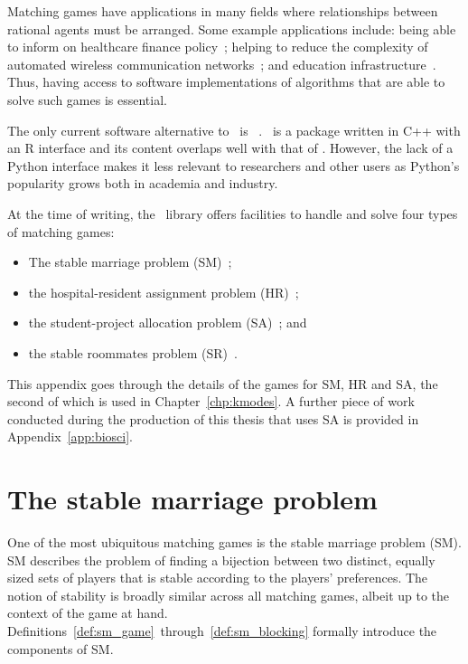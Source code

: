 Matching games have applications in many fields where relationships between
rational agents must be arranged. Some example applications include: being able
to inform on healthcare finance policy~\cite{Agarwal2017}; helping to reduce the
complexity of automated wireless communication networks~\cite{Bayat2016}; and
education infrastructure~\cite{Chiarandini2019}. Thus, having access to software
implementations of algorithms that are able to solve such games is essential.

The only current software alternative to \matching\ is
\matchingr~\cite{Tilly2018}. \matchingr\ is a package written in C++ with an R
interface and its content overlaps well with that of \matching. However, the
lack of a Python interface makes it less relevant to researchers and other users
as Python's popularity grows both in academia and industry.

At the time of writing, the \matching\ library offers facilities to handle and
solve four types of matching games:

\begin{itemize}
    \item The stable marriage problem (SM)~\cite{Gale1962};
    \item the hospital-resident assignment problem
        (HR)~\cite{Gale1962,Roth1984};
    \item the student-project allocation problem
        (SA)~\cite{Abraham2003,Abraham2007}; and
    \item the stable roommates problem (SR)~\cite{Irving1985}.
\end{itemize}

This appendix goes through the details of the games for SM, HR and SA, the
second of which is used in Chapter~\ref{chp:kmodes}. A further piece of work
conducted during the production of this thesis that uses SA is provided in
Appendix~\ref{app:biosci}.


\section{The stable marriage problem}

One of the most ubiquitous matching games is the stable marriage problem (SM).
SM describes the problem of finding a bijection between two distinct, equally
sized sets of players that is stable according to the players' preferences. The
notion of stability is broadly similar across all matching games, albeit up to
the context of the game at hand.
Definitions~\ref{def:sm_game}~through~\ref{def:sm_blocking} formally introduce
the components of SM.

